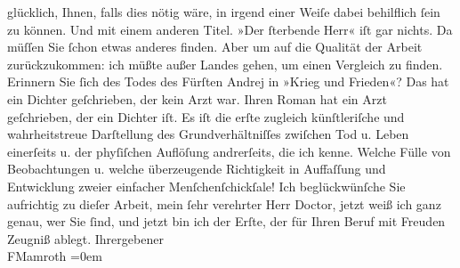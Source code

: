 \begin{ledgroupsized}[t]{13cm}
                    glücklich, Ihnen, falls dies nötig wäre, in irgend einer Weiſe dabei behilflich
                    ſein zu können. Und mit einem anderen Titel. »Der
                        ſterbende Herr« iſt gar nichts. Da müſſen Sie ſchon etwas anderes
                    finden. Aber um auf die Qualität der Arbeit zurückzukommen: ich müßte außer
                    Landes gehen, um einen Vergleich zu finden. Erinnern Sie ſich des Todes des
                    Fürſten Andrej in »Krieg und Frieden«? Das
                    hat ein Dichter geſchrieben, der kein Arzt
                    war. Ihren Roman hat ein Arzt geſchrieben, der ein Dichter iſt. Es iſt die erſte
                    zugleich künſtleriſche und wahrheitstreue Darſtellung des Grundverhältniſſes
                    zwiſchen Tod u. Leben einerſeits u. der phyſiſchen Auflöſung andrerſeits, die
                    ich kenne. Welche Fülle von Beobachtungen u. welche überzeugende Richtigkeit in
                    Auffaſſung und Entwicklung zweier einfacher Menſchenſchickſale! Ich
                    beglückwünſche Sie aufrichtig zu dieſer Arbeit, mein ſehr verehrter Herr Doctor,
                    jetzt weiß ich ganz genau, wer Sie ſind, und jetzt bin ich der Erſte, der für
                    Ihren Beruf mit Freuden Zeugniß ablegt.\pend
           \pstart
           Ihr\hspace*{1.5em}ergebener{\\[\baselineskip]}\spacefill\mbox{FMamroth}\pend
           \leftskip=0em{}          \endnumbering{}\end{ledgroupsized}  \newcommand{\dateiname}{L00186}\newcommand{\titel}{Fedor Mamroth an Arthur Schnitzler, 5. 3. 1893}\newcommand{\editorInnen}{Martin Anton Müller und Gerd-Hermann Susen}
            \footnotesize
\begin{ledgroupsized}[t]{11.5cm}
\end{ledgroupsized}
         
      